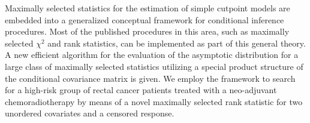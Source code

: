 Maximally selected statistics for the estimation of simple cutpoint models
are embedded into a generalized conceptual framework for conditional inference
procedures. 
Most of the published procedures in this area, such as maximally selected
$\chi^2$ and rank statistics, can be implemented as part of this general theory.
A new efficient algorithm for the evaluation of the asymptotic distribution 
for a large class of maximally selected statistics utilizing a special 
product structure of the conditional covariance matrix is given.
We employ the framework to search for a high-risk group of rectal
cancer patients treated with a neo-adjuvant chemoradiotherapy by means of a novel
maximally selected rank statistic for two unordered %
covariates and a censored response.
